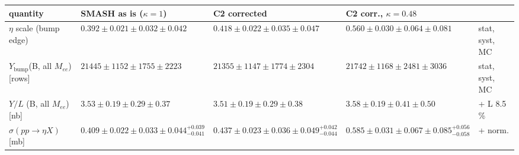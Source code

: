 \begin{tabular}{lllll}
\hline
 quantity & SMASH as is ($\kappa=1$) & C2 corrected & C2 corr., $\kappa=0.48$ & \\
\hline
 $\eta$ scale (bump edge) & $0.392\pm0.021\pm0.032\pm0.042$ & $0.418\pm0.022\pm0.035\pm0.047$ & $0.560\pm0.030\pm0.064\pm0.081$ & stat, syst, MC \\
 $Y_{\mathrm{bump}}$(B, all $M_{ee}$) [rows] & $21445\pm1152\pm1755\pm2223$ & $21355\pm1147\pm1774\pm2304$ & $21742\pm1168\pm2481\pm3036$ & stat, syst, MC \\
 $Y/L$ (B, all $M_{ee}$) [nb] & $3.53\pm0.19\pm0.29\pm0.37$ & $3.51\pm0.19\pm0.29\pm0.38$ & $3.58\pm0.19\pm0.41\pm0.50$ & + L 8.5\,\% \\
 $\sigma(pp\to\eta X)$ [mb] & $0.409\pm0.022\pm0.033\pm0.044^{+0.039}_{-0.041}$ & $0.437\pm0.023\pm0.036\pm0.049^{+0.042}_{-0.044}$ & $0.585\pm0.031\pm0.067\pm0.085^{+0.056}_{-0.058}$ & + norm. \\
\hline
\end{tabular}
